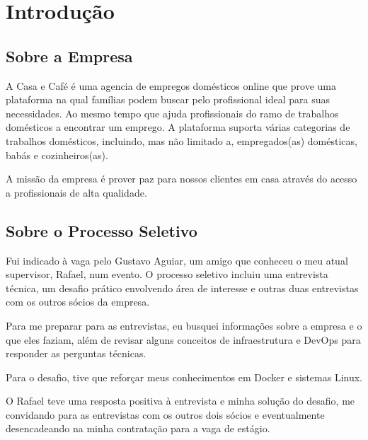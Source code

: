 \chapter{Introdução}\label{chap:intro}

\section{Sobre a Empresa}

A Casa e Café é uma agencia de empregos domésticos online que prove uma plataforma na qual famílias podem buscar pelo profissional ideal para suas necessidades. Ao mesmo tempo que ajuda profissionais do ramo de trabalhos domésticos a encontrar um emprego. A plataforma suporta várias categorias de trabalhos domésticos, incluindo, mas não limitado a, empregados(as) domésticas, babás e cozinheiros(as).

A missão da empresa é prover paz para nossos clientes em casa através do acesso a profissionais de alta qualidade.



\section{Sobre o Processo Seletivo}

Fui indicado à vaga pelo Gustavo Aguiar, um amigo que conheceu o meu atual supervisor, Rafael, num evento. O processo seletivo incluiu uma entrevista técnica, um desafio prático envolvendo área de interesse e outras duas entrevistas com os outros sócios da empresa.

Para me preparar para as entrevistas, eu busquei informações sobre a empresa e o que eles faziam, além de revisar alguns conceitos de infraestrutura e DevOps para responder as perguntas técnicas.

Para o desafio, tive que reforçar meus conhecimentos em Docker e sistemas Linux.

O Rafael teve uma resposta positiva à entrevista e minha solução do desafio, me convidando para as entrevistas com os outros dois sócios e eventualmente desencadeando na minha contratação para a vaga de estágio.

